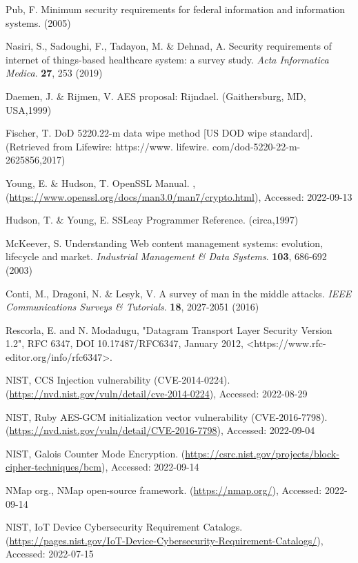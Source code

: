 Pub, F. Minimum security requirements for federal information and information systems.  (2005)

Nasiri, S., Sadoughi, F., Tadayon, M. \& Dehnad, A. Security requirements of internet of things-based healthcare system: a survey study. {\em Acta Informatica Medica}. \textbf{27}, 253 (2019)

Daemen, J. \& Rijmen, V. AES proposal: Rijndael. (Gaithersburg, MD, USA,1999)

Fischer, T. DoD 5220.22-m data wipe method [US DOD wipe standard]. (Retrieved from Lifewire: https://www. lifewire. com/dod-5220-22-m-2625856,2017)

Young, E. \& Hudson, T. OpenSSL Manual. , (\url{https://www.openssl.org/docs/man3.0/man7/crypto.html}), Accessed: 2022-09-13

Hudson, T. \& Young, E. SSLeay Programmer Reference. (circa,1997)

McKeever, S. Understanding Web content management systems: evolution, lifecycle and market. {\em Industrial Management \& Data Systems}. \textbf{103}, 686-692 (2003)

Conti, M., Dragoni, N. \& Lesyk, V. A survey of man in the middle attacks. {\em IEEE Communications Surveys \& Tutorials}. \textbf{18}, 2027-2051 (2016)

 Rescorla, E. and N. Modadugu, "Datagram Transport Layer Security Version 1.2", RFC 6347, DOI 10.17487/RFC6347, January 2012, <https://www.rfc-editor.org/info/rfc6347>.

 NIST, CCS Injection vulnerability (CVE-2014-0224). (\url{https://nvd.nist.gov/vuln/detail/cve-2014-0224}), Accessed: 2022-08-29

 NIST, Ruby AES-GCM initialization vector vulnerability (CVE-2016-7798). (\url{https://nvd.nist.gov/vuln/detail/CVE-2016-7798}), Accessed: 2022-09-04

 NIST, Galois Counter Mode Encryption. (\url{https://csrc.nist.gov/projects/block-cipher-techniques/bcm}), Accessed: 2022-09-14

 NMap org., NMap open-source framework. (\url{https://nmap.org/}), Accessed: 2022-09-14

 NIST, IoT Device Cybersecurity Requirement Catalogs. (\url{https://pages.nist.gov/IoT-Device-Cybersecurity-Requirement-Catalogs/}), Accessed: 2022-07-15